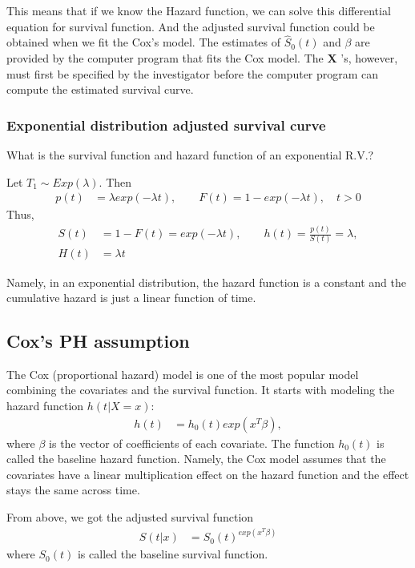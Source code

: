 \documentclass[11pt]{article} %
\begin{document}
This means that if we know the Hazard function, we can solve this differential equation for survival function. And the adjusted survival function could be obtained when we fit the Cox's model. The estimates of $\hat{S}_0(t)$ and $\beta$  are provided by the computer program that fits the Cox model. The  $\mathbf{X}$ ’s, however, must first be specified by the investigator before the computer program can compute the estimated survival curve.

\subsubsection{Exponential distribution adjusted survival curve}
What is the survival function and hazard function of an exponential R.V.? 

Let $T_1 \sim Exp(\lambda)$.
Then
\begin{align*}
	p(t) &= \lambda exp(-\lambda t), \qquad F(t) = 1- exp(-\lambda t), \quad t>0
\end{align*}
Thus,
\begin{align*}
	S(t) &= 1- F(t) =  exp(-\lambda t), \qquad h(t) = \frac{p(t)}{S(t)} = \lambda, \\
	H(t) &= \lambda t
\end{align*}

Namely, in an exponential distribution, the hazard function is a constant and the cumulative hazard is just a linear function of time. 

 


\subsection{Cox's PH assumption}
The Cox (proportional hazard) model is one of the most popular model combining the covariates and the survival function. It starts with modeling the hazard function $h(t|X = x)$:
\begin{align*}
	h(t) &= h_0(t) exp(x^T \beta), 
\end{align*}
where $\beta$ is the vector of coefficients of each covariate. The function $h_0(t)$ is called the baseline hazard function. Namely, the Cox model assumes that the covariates have a linear multiplication effect on the hazard function and the effect stays the same across time. 

From above, we got the adjusted survival function 
\begin{align*}
	S(t|x) &=  S_0(t)^{exp(x^T \beta)}
\end{align*}
where $S_0(t)$ is called the baseline survival function.
\end{document}
